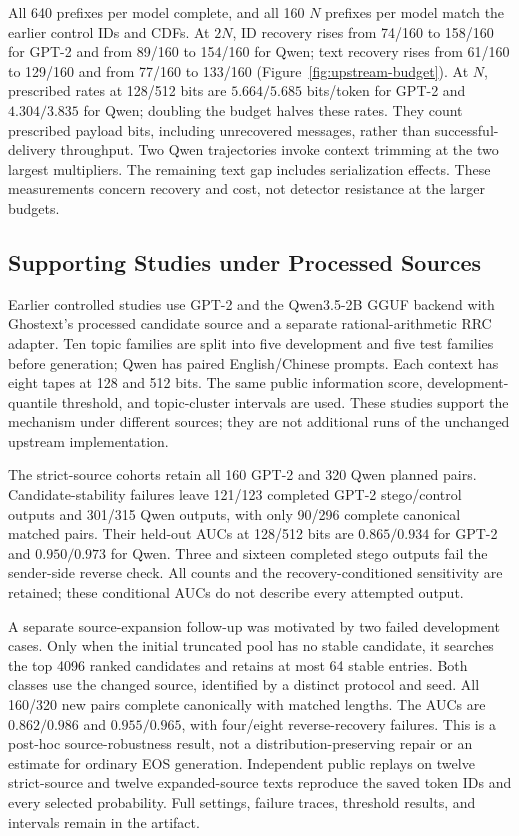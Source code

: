 All 640 prefixes per model complete, and all 160 $N$ prefixes per model match
the earlier control IDs and CDFs. At $2N$, ID recovery rises from 74/160 to
158/160 for GPT-2 and from 89/160 to 154/160 for Qwen; text recovery rises
from 61/160 to 129/160 and from 77/160 to 133/160
(Figure~\ref{fig:upstream-budget}). At $N$, prescribed rates at 128/512 bits
are $5.664/5.685$ bits/token for GPT-2 and $4.304/3.835$ for Qwen; doubling
the budget halves these rates. They count prescribed payload bits, including
unrecovered messages, rather than successful-delivery throughput. Two Qwen
trajectories invoke context trimming at the two largest multipliers.
The remaining text gap includes serialization effects. These measurements
concern recovery and cost, not detector resistance at the larger budgets.

\subsection{Supporting Studies under Processed Sources}

Earlier controlled studies use GPT-2 and the Qwen3.5-2B GGUF backend with
Ghostext's processed candidate source and a separate rational-arithmetic RRC
adapter. Ten topic families are split into five development and five test
families before generation; Qwen has paired English/Chinese prompts. Each
context has eight tapes at 128 and 512 bits. The same public information score,
development-quantile threshold, and topic-cluster intervals are used. These
studies support the mechanism under different sources; they are not additional
runs of the unchanged upstream implementation.

The strict-source cohorts retain all 160 GPT-2 and 320 Qwen planned pairs.
Candidate-stability failures leave 121/123 completed GPT-2 stego/control
outputs and 301/315 Qwen outputs, with only 90/296 complete canonical matched
pairs. Their held-out AUCs at 128/512 bits are $0.865/0.934$ for GPT-2 and
$0.950/0.973$ for Qwen. Three and sixteen completed stego outputs fail the
sender-side reverse check. All counts and the recovery-conditioned sensitivity
are retained; these conditional AUCs do not describe every attempted output.

A separate source-expansion follow-up was motivated by two failed development
cases. Only when the initial truncated pool has no stable candidate, it searches
the top 4096 ranked candidates and retains at most 64 stable entries. Both
classes use the changed source, identified by a distinct protocol and seed.
All 160/320 new pairs complete canonically with matched lengths. The AUCs are
$0.862/0.986$ and $0.955/0.965$, with four/eight reverse-recovery failures.
This is a post-hoc source-robustness result, not a distribution-preserving
repair or an estimate for ordinary EOS generation. Independent public replays
on twelve strict-source and twelve expanded-source texts reproduce the saved
token IDs and every selected probability. Full settings, failure traces,
threshold results, and intervals remain in the artifact.

